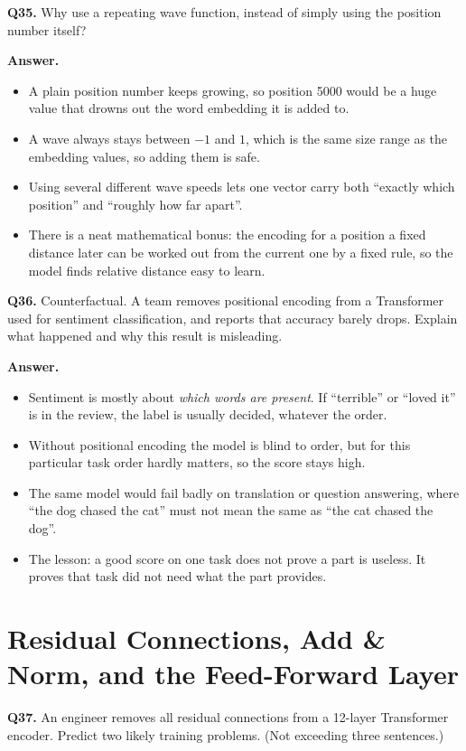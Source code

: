 \documentclass[11pt]{article}
\begin{document}
\medskip
\textbf{Q35.} Why use a repeating wave function, instead of simply using the position number
itself?

\textbf{Answer.}
\begin{itemize}
  \item A plain position number keeps growing, so position 5000 would be a huge value that drowns out the word embedding it is added to.
  \item A wave always stays between $-1$ and $1$, which is the same size range as the embedding values, so adding them is safe.
  \item Using several different wave speeds lets one vector carry both ``exactly which position'' and ``roughly how far apart''.
  \item There is a neat mathematical bonus: the encoding for a position a fixed distance later can be worked out from the current one by a fixed rule, so the model finds relative distance easy to learn.
\end{itemize}

\medskip
\textbf{Q36.} Counterfactual. A team removes positional encoding from a Transformer used for
sentiment classification, and reports that accuracy barely drops. Explain what happened and
why this result is misleading.

\textbf{Answer.}
\begin{itemize}
  \item Sentiment is mostly about \emph{which words are present}. If ``terrible'' or ``loved it'' is in the review, the label is usually decided, whatever the order.
  \item Without positional encoding the model is blind to order, but for this particular task order hardly matters, so the score stays high.
  \item The same model would fail badly on translation or question answering, where ``the dog chased the cat'' must not mean the same as ``the cat chased the dog''.
  \item The lesson: a good score on one task does not prove a part is useless. It proves that task did not need what the part provides.
\end{itemize}

\section{Residual Connections, Add \& Norm, and the Feed-Forward Layer}

\textbf{Q37.} An engineer removes all residual connections from a 12-layer Transformer
encoder. Predict two likely training problems. (Not exceeding three sentences.)
\end{document}
